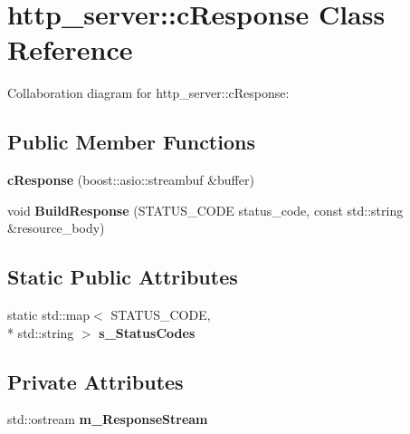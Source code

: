 \hypertarget{classhttp__server_1_1cResponse}{\section{http\-\_\-server\-:\-:c\-Response Class Reference}
\label{classhttp__server_1_1cResponse}
}


Collaboration diagram for http\-\_\-server\-:\-:c\-Response\-:
\subsection*{Public Member Functions}
\begin{DoxyCompactItemize}
\item 
\hypertarget{classhttp__server_1_1cResponse_abdb27671f4818f6e6bcbc11530d18ebc}{{\bfseries c\-Response} (boost\-::asio\-::streambuf \&buffer)}\label{classhttp__server_1_1cResponse_abdb27671f4818f6e6bcbc11530d18ebc}

\item 
\hypertarget{classhttp__server_1_1cResponse_a484e013d4e453a86156b35adaf3eda5b}{void {\bfseries Build\-Response} (S\-T\-A\-T\-U\-S\-\_\-\-C\-O\-D\-E status\-\_\-code, const std\-::string \&resource\-\_\-body)}\label{classhttp__server_1_1cResponse_a484e013d4e453a86156b35adaf3eda5b}

\end{DoxyCompactItemize}
\subsection*{Static Public Attributes}
\begin{DoxyCompactItemize}
\item 
static std\-::map$<$ S\-T\-A\-T\-U\-S\-\_\-\-C\-O\-D\-E, \\*
std\-::string $>$ {\bfseries s\-\_\-\-Status\-Codes}
\end{DoxyCompactItemize}
\subsection*{Private Attributes}
\begin{DoxyCompactItemize}
\item 
\hypertarget{classhttp__server_1_1cResponse_a26980e4d210c8f2e766d3ae987262160}{std\-::ostream {\bfseries m\-\_\-\-Response\-Stream}}\label{classhttp__server_1_1cResponse_a26980e4d210c8f2e766d3ae987262160}

\end{DoxyCompactItemize}


